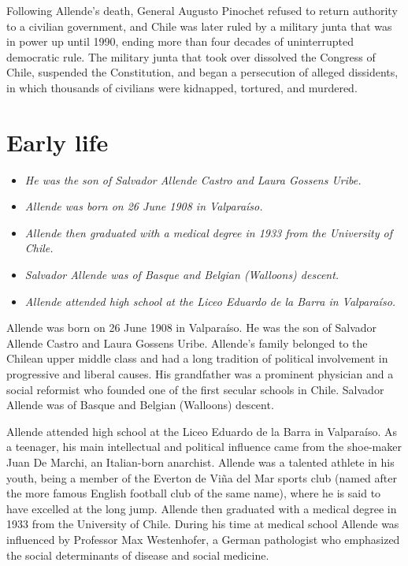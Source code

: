Following Allende's death, General Augusto Pinochet refused to return
authority to a civilian government, and Chile was later ruled by a
military junta that was in power up until 1990, ending more than four
decades of uninterrupted democratic rule. The military junta that took
over dissolved the Congress of Chile, suspended the Constitution, and
began a persecution of alleged dissidents, in which thousands of
civilians were kidnapped, tortured, and murdered.

\section{Early life}\label{early-life}

\begin{itemize}
\item
  \emph{He was the son of Salvador Allende Castro and Laura Gossens
  Uribe.}
\item
  \emph{Allende was born on 26 June 1908 in Valparaíso.}
\item
  \emph{Allende then graduated with a medical degree in 1933 from the
  University of Chile.}
\item
  \emph{Salvador Allende was of Basque and Belgian (Walloons) descent.}
\item
  \emph{Allende attended high school at the Liceo Eduardo de la Barra in
  Valparaíso.}
\end{itemize}

Allende was born on 26 June 1908 in Valparaíso. He was the son of
Salvador Allende Castro and Laura Gossens Uribe. Allende's family
belonged to the Chilean upper middle class and had a long tradition of
political involvement in progressive and liberal causes. His grandfather
was a prominent physician and a social reformist who founded one of the
first secular schools in Chile. Salvador Allende was of Basque and
Belgian (Walloons) descent.

Allende attended high school at the Liceo Eduardo de la Barra in
Valparaíso. As a teenager, his main intellectual and political influence
came from the shoe-maker Juan De Marchi, an Italian-born anarchist.
Allende was a talented athlete in his youth, being a member of the
Everton de Viña del Mar sports club (named after the more famous English
football club of the same name), where he is said to have excelled at
the long jump. Allende then graduated with a medical degree in 1933 from
the University of Chile. During his time at medical school Allende was
influenced by Professor Max Westenhofer, a German pathologist who
emphasized the social determinants of disease and social medicine.

